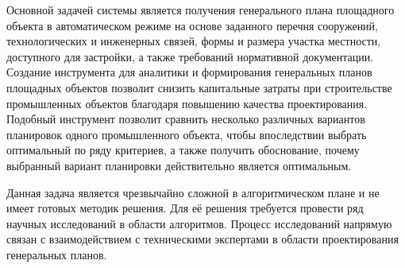 Основной задачей системы является получения генерального
плана площадного объекта в автоматическом режиме
на основе заданного перечня сооружений,
технологических и инженерных связей, формы и размера участка местности,
доступного для застройки, а также требований нормативной документации.
Создание инструмента для аналитики и формирования генеральных планов
площадных объектов позволит снизить капитальные затраты
при строительстве промышленных объектов благодаря повышению качества проектирования.
Подобный инструмент позволит сравнить несколько различных вариантов планировок
одного промышленного объекта, чтобы впоследствии выбрать оптимальный по ряду критериев,
а также получить обоснование, почему выбранный вариант планировки действительно является оптимальным.


Данная задача является чрезвычайно сложной в алгоритмическом плане и не имеет готовых методик решения.
Для её решения требуется провести ряд научных исследований в области алгоритмов.
Процесс исследований напрямую связан с взаимодействием
с техническими экспертами в области проектирования генеральных планов.
